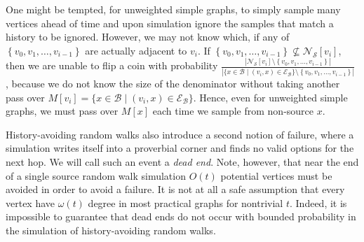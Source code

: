 \documentclass[10]{article}
\begin{document}
One might be tempted, for unweighted simple graphs, to simply sample many vertices ahead of time and upon simulation ignore the samples that match a history to be ignored.
However, we may not know which, if any of $\left \{ v_0, v_1, \dots, v_{i-1} \right \}$ are actually adjacent to $v_i$. 
If $\left \{ v_0, v_1, \dots, v_{i-1} \right \} \not \subseteq \mathcal{N}_\mathcal{S}[v_i]$, then we are unable to flip a coin with probability 
$\frac{|\mathcal{N}_\mathcal{S}[v_i] \setminus \left \{ v_0, v_1, \dots, v_{i-1} \right \}|}
{|\{ x \in \mathcal{B} \mid (v_i, x) \in \mathcal{E}_\mathcal{B} \} \setminus \left \{ v_0, v_1, \dots, v_{i-1} \right \}|}$
, because we do not know the size of the denominator without taking another pass over $M[v_i] = \{ x \in \mathcal{B} \mid (v_i, x) \in \mathcal{E}_\mathcal{B} \}$.
Hence, even for unweighted simple graphs, we must pass over $M[x]$ each time we sample from non-source $x$.

History-avoiding random walks also introduce a second notion of failure, where a simulation writes itself into a proverbial corner and finds no valid options for the next hop. 
We will call such an event a \emph{dead end}. 
Note, however, that near the end of a single source random walk simulation $O(t)$ potential vertices must be avoided in order to avoid a failure. 
It is not at all a safe assumption that every vertex have $\omega(t)$ degree in most practical graphs for nontrivial $t$.
Indeed, it is impossible to guarantee that dead ends do not occur with bounded probability in the simulation of history-avoiding random walks.  
\end{document}
